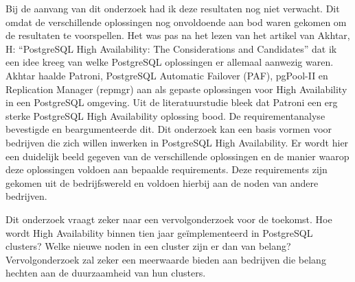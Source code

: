 Bij de aanvang van dit onderzoek had ik deze resultaten nog niet verwacht. Dit omdat de verschillende oplossingen nog onvoldoende aan bod waren gekomen om de resultaten te voorspellen. Het was pas na het lezen van het artikel van Akhtar, H: “PostgreSQL High Availability: The Considerations and Candidates” dat ik een idee kreeg van welke PostgreSQL oplossingen er allemaal aanwezig waren. Akhtar haalde Patroni, PostgreSQL Automatic Failover (PAF), pgPool-II en Replication Manager (repmgr) aan als gepaste oplossingen voor High Availability in een PostgreSQL omgeving. Uit de literatuurstudie bleek dat Patroni een erg sterke PostgreSQL High Availability oplossing bood. De requirementanalyse bevestigde en beargumenteerde dit. 
Dit onderzoek kan een basis vormen voor bedrijven die zich willen inwerken in PostgreSQL High Availability. Er wordt hier een duidelijk beeld gegeven van de verschillende oplossingen en de manier waarop deze oplossingen voldoen aan bepaalde requirements. Deze requirements zijn gekomen uit de bedrijfswereld en voldoen hierbij aan de noden van andere bedrijven. 

Dit onderzoek vraagt zeker naar een vervolgonderzoek voor de toekomst. Hoe wordt High Availability binnen tien jaar geïmplementeerd in PostgreSQL clusters? Welke nieuwe noden in een cluster zijn er dan van belang?
Vervolgonderzoek zal zeker een meerwaarde bieden aan bedrijven die belang hechten aan de duurzaamheid van hun clusters.






